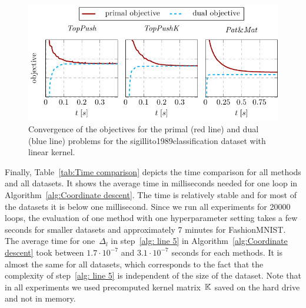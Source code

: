 \begin{figure}[!ht]
  \centering
  \includegraphics[width = \linewidth]{images/dual_results3.pdf}
  \caption{Convergence of the objectives for the primal (red line) and dual (blue line) problems for the sigillito1989classification dataset with linear kernel.}
  \label{fig:Convergence comparison}
\end{figure}

Finally, Table~\ref{tab:Time comparison} depicts the time comparison for all methods and all datasets. It shows the average time in milliseconds needed for one \repeatloop loop in Algorithm~\ref{alg:Coordinate descent}. The time is relatively stable and for most of the datasets it is below one millisecond. Since we run all experiments for 20000 \repeatloop loops, the evaluation of one method with one hyperparameter setting takes a few seconds for smaller datasets and approximately 7 minutes for FashionMNIST. The average time for one~$\Delta_l$ in step~\ref{alg: line 5} in Algorithm~\ref{alg:Coordinate descent} took between $1.7\cdot 10^{-7}$ and $3.1\cdot 10^{-7}$ seconds for each methods. It is almost the same for all datasets, which corresponds to the fact that the complexity of step~\ref{alg: line 5} is independent of the size of the dataset. Note that in all experiments we used precomputed kernel matrix~$\mathbb{K}$ saved on the hard drive and not in memory.


